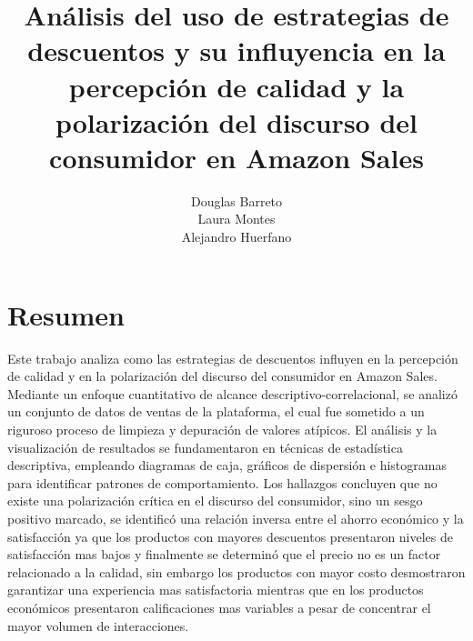 \documentclass[oneside,11pt]{Latex/Classes/PhDthesisPSnPDF}
\title{Análisis del uso de estrategias de descuentos y su influyencia en
la percepción de calidad y la polarización del discurso del consumidor
en Amazon Sales}
\author{Douglas Barreto \\ Laura Montes \\ Alejandro Huerfano}
\begin{document}
\maketitle

\frontmatter


\setcounter{secnumdepth}{3}
\setcounter{tocdepth}{3}

\tableofcontents



\cleardoublepage

  \cleardoublepage       %
  \chapter*{Resumen}     %
  
  Este trabajo analiza como las estrategias de descuentos influyen en la
percepción de calidad y en la polarización del discurso del consumidor
en Amazon Sales. Mediante un enfoque cuantitativo de alcance
descriptivo-correlacional, se analizó un conjunto de datos de ventas de
la plataforma, el cual fue sometido a un riguroso proceso de limpieza y
depuración de valores atípicos. El análisis y la visualización de
resultados se fundamentaron en técnicas de estadística descriptiva,
empleando diagramas de caja, gráficos de dispersión e histogramas para
identificar patrones de comportamiento. Los hallazgos concluyen que no
existe una polarización crítica en el discurso del consumidor, sino un
sesgo positivo marcado, se identificó una relación inversa entre el
ahorro económico y la satisfacción ya que los productos con mayores
descuentos presentaron niveles de satisfacción mas bajos y finalmente se
determinó que el precio no es un factor relacionado a la calidad, sin
embargo los productos con mayor costo desmostraron garantizar una
experiencia mas satisfactoria mientras que en los productos económicos
presentaron calificaciones mas variables a pesar de concentrar el mayor
volumen de
interacciones.             %
  
\end{document}

